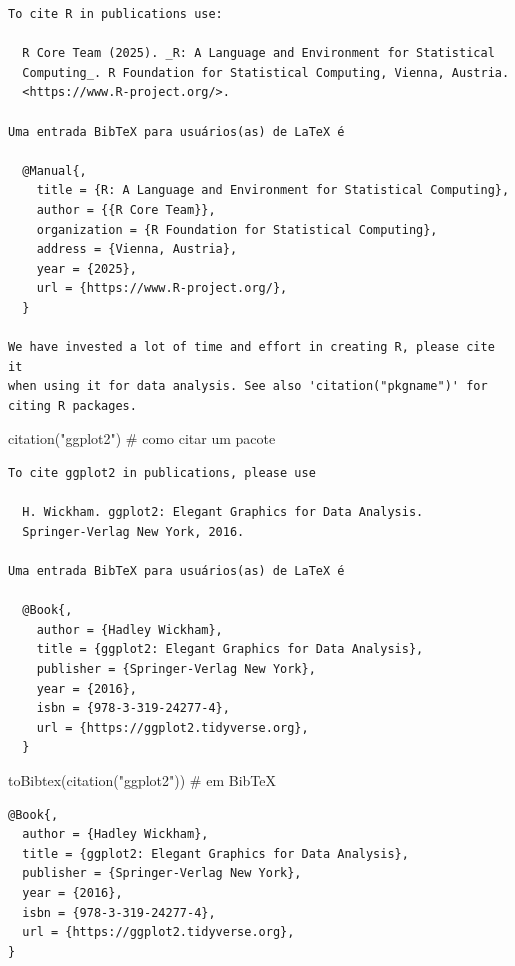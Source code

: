 \documentclass[
  letterpaper,
  DIV=11,
  numbers=noendperiod]{scrreprt}
\newenvironment{Shaded}{\begin{snugshade}}{\end{snugshade}}
\newcommand{\CommentTok}[1]{\textcolor[rgb]{0.37,0.37,0.37}{#1}}
\newcommand{\FunctionTok}[1]{\textcolor[rgb]{0.28,0.35,0.67}{#1}}
\newcommand{\NormalTok}[1]{\textcolor[rgb]{0.00,0.23,0.31}{#1}}
\newcommand{\StringTok}[1]{\textcolor[rgb]{0.13,0.47,0.30}{#1}}
\begin{document}
\begin{verbatim}
To cite R in publications use:

  R Core Team (2025). _R: A Language and Environment for Statistical
  Computing_. R Foundation for Statistical Computing, Vienna, Austria.
  <https://www.R-project.org/>.

Uma entrada BibTeX para usuários(as) de LaTeX é

  @Manual{,
    title = {R: A Language and Environment for Statistical Computing},
    author = {{R Core Team}},
    organization = {R Foundation for Statistical Computing},
    address = {Vienna, Austria},
    year = {2025},
    url = {https://www.R-project.org/},
  }

We have invested a lot of time and effort in creating R, please cite it
when using it for data analysis. See also 'citation("pkgname")' for
citing R packages.
\end{verbatim}

\begin{Shaded}
\begin{Highlighting}[]
\FunctionTok{citation}\NormalTok{(}\StringTok{"ggplot2"}\NormalTok{)   }\CommentTok{\# como citar um pacote}
\end{Highlighting}
\end{Shaded}

\begin{verbatim}
To cite ggplot2 in publications, please use

  H. Wickham. ggplot2: Elegant Graphics for Data Analysis.
  Springer-Verlag New York, 2016.

Uma entrada BibTeX para usuários(as) de LaTeX é

  @Book{,
    author = {Hadley Wickham},
    title = {ggplot2: Elegant Graphics for Data Analysis},
    publisher = {Springer-Verlag New York},
    year = {2016},
    isbn = {978-3-319-24277-4},
    url = {https://ggplot2.tidyverse.org},
  }
\end{verbatim}

\begin{Shaded}
\begin{Highlighting}[]
\FunctionTok{toBibtex}\NormalTok{(}\FunctionTok{citation}\NormalTok{(}\StringTok{"ggplot2"}\NormalTok{))  }\CommentTok{\# em BibTeX }
\end{Highlighting}
\end{Shaded}

\begin{verbatim}
@Book{,
  author = {Hadley Wickham},
  title = {ggplot2: Elegant Graphics for Data Analysis},
  publisher = {Springer-Verlag New York},
  year = {2016},
  isbn = {978-3-319-24277-4},
  url = {https://ggplot2.tidyverse.org},
}
\end{verbatim}
\end{document}
